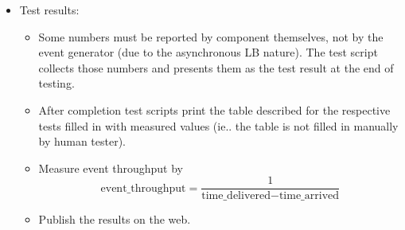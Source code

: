 \begin{itemize}
\item Test results:
   \begin{itemize}
   \item Some numbers must be reported by component themselves, not by
      the event generator (due to the asynchronous LB nature). The
      test script collects those numbers and presents them as the test
      result at the end of testing.

    \item After completion test scripts print the table described for the
      respective tests filled in with measured values (ie.. the table
      is not filled in manually by human tester).

    \item Measure event throughput by
    \[ \mbox{event\_throughput} = \frac{1}{\mbox{time\_delivered} - \mbox{time\_arrived}} \]

    \item Publish the results on the web.
    
    \end{itemize}

%
\end{itemize}



\endinput


In the following subsections we describe performance and stress tests for
individual LB components.  They include both tests of the isolated components
on one node (may require binaries from other components to produce/consume
events) as well as tests of LB components among more nodes.


\subsection{Logging library test}

